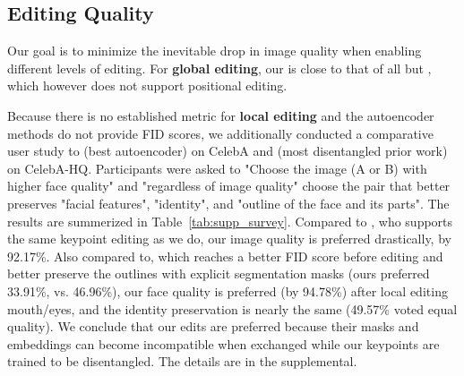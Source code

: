 \documentclass[10pt, conference, compsocconf]{IEEEtran}
\begin{document}
\subsection{Editing Quality}
\label{sec:image_quality}
Our goal is to minimize the inevitable drop in image quality when enabling different levels of editing. 
For \textbf{global editing}, our  is close to that of all but \cite{kim2021exploiting}, which however does not support positional editing.

 Because there is no established metric for \textbf{local editing} and the autoencoder methods do not provide FID scores, we additionally conducted a comparative user study to  \cite{zhang2018unsupervised} (best autoencoder) on CelebA and \cite{zhu2020sean} (most disentangled prior work) on CelebA-HQ. Participants were asked to "Choose the image (A or B) with higher face quality" and "regardless of image quality" choose the pair that better preserves "facial features", "identity", and "outline of the face and its parts". The results are summerized in Table~\ref{tab:supp_survey}.
Compared to \cite{zhang2018unsupervised}, who supports the same keypoint editing as we do, our image quality is preferred drastically, by 92.17\%.
Also compared to, \cite{zhu2020sean} which reaches a better FID score before editing and better preserve the outlines with explicit segmentation masks (ours preferred 33.91\%, vs. 46.96\%), our face quality is preferred (by 94.78\%) after local editing mouth/eyes, and the identity preservation is nearly the same (49.57\% voted equal quality). We conclude that our edits are preferred because their masks and embeddings can become incompatible when exchanged while our keypoints are trained to be disentangled. 
The details are in the supplemental. 

\begin{table}
\begin{center}
\end{center}
\caption{\textbf{Survey results}.
}
\label{tab:supp_survey}
\end{table}
\end{document}

